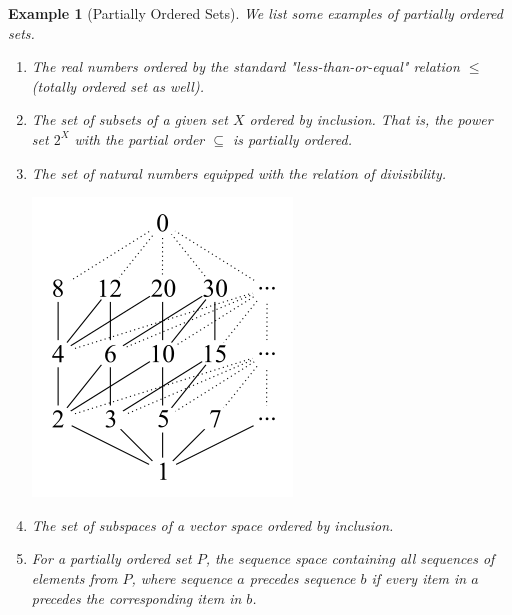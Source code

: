 \documentclass{article}
\newtheorem{example}{Example}[section]
\theoremstyle{remark}
\theoremstyle{definition}
\begin{document}
\begin{example}[Partially Ordered Sets]
We list some examples of partially ordered sets. 
\begin{enumerate}
    \item The real numbers ordered by the standard "less-than-or-equal" relation $\leq$ (totally ordered set as well). 
    \item The set of subsets of a given set $X$ ordered by inclusion. That is, the power set $2^X$ with the partial order $\subseteq$ is partially ordered. 
    \item The set of natural numbers equipped with the relation of divisibility. 
    \begin{center}
        \includegraphics[scale=0.5]{img/Natural_Numbers_Ordered_by_Divisibility.png}
    \end{center}
    \item The set of subspaces of a vector space ordered by inclusion. 
    \item For a partially ordered set $P$, the sequence space containing all sequences of elements from $P$, where sequence $a$ precedes sequence $b$ if every item in $a$ precedes the corresponding item in $b$. 
\end{enumerate}
\end{example}
\end{document}
